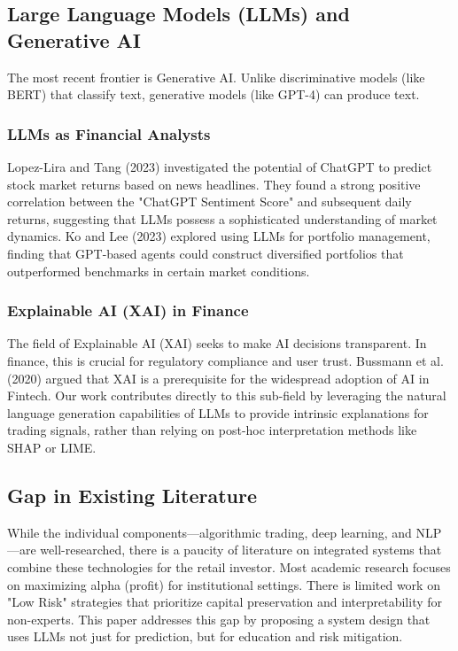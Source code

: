 \subsection{Large Language Models (LLMs) and Generative AI}
The most recent frontier is Generative AI. Unlike discriminative models (like BERT) that classify text, generative models (like GPT-4) can produce text.
\subsubsection{LLMs as Financial Analysts}
Lopez-Lira and Tang (2023) investigated the potential of ChatGPT to predict stock market returns based on news headlines. They found a strong positive correlation between the "ChatGPT Sentiment Score" and subsequent daily returns, suggesting that LLMs possess a sophisticated understanding of market dynamics.
Ko and Lee (2023) explored using LLMs for portfolio management, finding that GPT-based agents could construct diversified portfolios that outperformed benchmarks in certain market conditions.

\subsubsection{Explainable AI (XAI) in Finance}
The field of Explainable AI (XAI) seeks to make AI decisions transparent. In finance, this is crucial for regulatory compliance and user trust. Bussmann et al. (2020) argued that XAI is a prerequisite for the widespread adoption of AI in Fintech. Our work contributes directly to this sub-field by leveraging the natural language generation capabilities of LLMs to provide intrinsic explanations for trading signals, rather than relying on post-hoc interpretation methods like SHAP or LIME.

\subsection{Gap in Existing Literature}
While the individual components—algorithmic trading, deep learning, and NLP—are well-researched, there is a paucity of literature on integrated systems that combine these technologies for the retail investor. Most academic research focuses on maximizing alpha (profit) for institutional settings. There is limited work on "Low Risk" strategies that prioritize capital preservation and interpretability for non-experts. This paper addresses this gap by proposing a system design that uses LLMs not just for prediction, but for education and risk mitigation.
